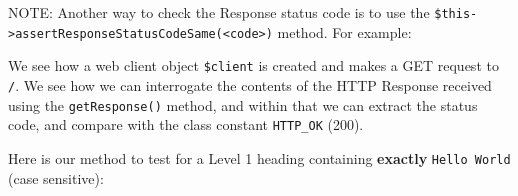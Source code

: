 \documentclass[a4paperpaper,openright]{book}
\newenvironment{Shaded}{}{}
\newcommand{\CommentTok}[1]{\textcolor[rgb]{0.38,0.63,0.69}{\textit{#1}}}
\newcommand{\KeywordTok}[1]{\textcolor[rgb]{0.00,0.44,0.13}{\textbf{#1}}}
\newcommand{\NormalTok}[1]{#1}
\newcommand{\OtherTok}[1]{\textcolor[rgb]{0.00,0.44,0.13}{#1}}
\newcommand{\StringTok}[1]{\textcolor[rgb]{0.25,0.44,0.63}{#1}}
\begin{document}
NOTE: Another way to check the Response status code is to use the
\texttt{\$this-\textgreater{}assertResponseStatusCodeSame(\textless{}code\textgreater{})}
method. For example:

\begin{Shaded}
\end{Shaded}

We see how a web client object \texttt{\$client} is created and makes a
GET request to \texttt{/}. We see how we can interrogate the contents of
the HTTP Response received using the \texttt{getResponse()} method, and
within that we can extract the status code, and compare with the class
constant \texttt{HTTP\_OK} (200).

Here is our method to test for a Level 1 heading containing
\textbf{exactly} \texttt{Hello\ World} (case sensitive):

\begin{Shaded}
\end{Shaded}
\end{document}
